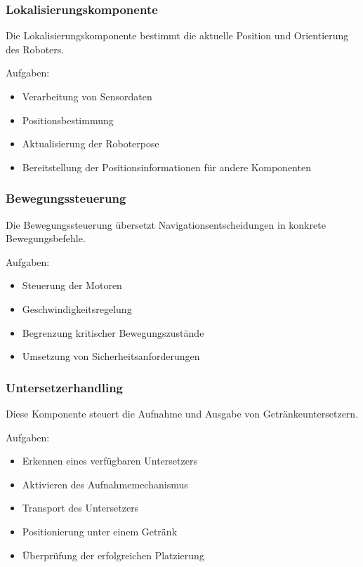 \documentclass[
  a4paper,
  12pt,
  DIV=12,        %
  parskip=half,  %
  headings=small %
]{scrartcl}
\theoremstyle{definition}
\providecommand{\tightlist}{%
  \setlength{\itemsep}{0pt}\setlength{\parskip}{0pt}}
\theoremstyle{definition}
\providecommand{\tightlist}{%
  \setlength{\itemsep}{0pt}\setlength{\parskip}{0pt}}
\begin{document}
\subsubsection{Lokalisierungskomponente}\label{lokalisierungskomponente}

Die Lokalisierungskomponente bestimmt die aktuelle Position und
Orientierung des Roboters.

Aufgaben:

\begin{itemize}
\tightlist
\item
  Verarbeitung von Sensordaten
\item
  Positionsbestimmung
\item
  Aktualisierung der Roboterpose
\item
  Bereitstellung der Positionsinformationen für andere Komponenten
\end{itemize}

\subsubsection{Bewegungssteuerung}\label{bewegungssteuerung}

Die Bewegungssteuerung übersetzt Navigationsentscheidungen in konkrete
Bewegungsbefehle.

Aufgaben:

\begin{itemize}
\tightlist
\item
  Steuerung der Motoren
\item
  Geschwindigkeitsregelung
\item
  Begrenzung kritischer Bewegungszustände
\item
  Umsetzung von Sicherheitsanforderungen
\end{itemize}

\subsubsection{Untersetzerhandling}\label{untersetzerhandling}

Diese Komponente steuert die Aufnahme und Ausgabe von
Getränkeuntersetzern.

Aufgaben:

\begin{itemize}
\tightlist
\item
  Erkennen eines verfügbaren Untersetzers
\item
  Aktivieren des Aufnahmemechanismus
\item
  Transport des Untersetzers
\item
  Positionierung unter einem Getränk
\item
  Überprüfung der erfolgreichen Platzierung
\end{itemize}
\end{document}
